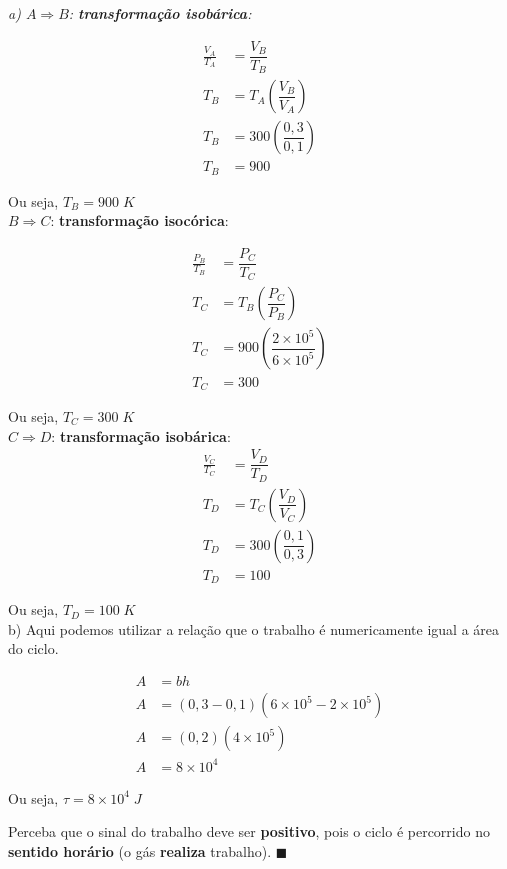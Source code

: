 \documentclass[12pt]{article}
\newenvironment{resposta*}
{\bf Resposta:\\ }
{}
\begin{document}
\begin{resposta*}
{\it a) $A\Rightarrow B$: \textbf{transformação isobárica}:

\begin{align*}
    \frac{V_{A}}{T_{A}} &= \dfrac{V_{B}}{T_{B}} \\
    T_{B} &= T_{A}\left(\dfrac{V_{B}}{V_{A}}\right) \\
    T_{B} &= 300\left(\dfrac{0,3}{0,1}\right) \\
    T_{B} &= 900
\end{align*}

Ou seja, $\boxed{T_{B} = 900\;K}$ \\

$B\Rightarrow C$: \textbf{transformação isocórica}:

\begin{align*}
    \frac{P_{B}}{T_{B}} &= \dfrac{P_{C}}{T_{C}} \\
    T_{C} &= T_{B}\left(\dfrac{P_{C}}{P_{B}}\right) \\
    T_{C} &= 900\left(\dfrac{2\times 10^{5}}{6\times 10^{5}}\right) \\
    T_{C} &= 300
\end{align*}

Ou seja, $\boxed{T_{C} = 300\;K}$ \\

$C\Rightarrow D$: \textbf{transformação isobárica}:
\begin{align*}
    \frac{V_{C}}{T_{C}} &= \dfrac{V_{D}}{T_{D}} \\
    T_{D} &= T_{C}\left(\dfrac{V_{D}}{V_{C}}\right) \\
    T_{D} &= 300\left(\dfrac{0,1}{0,3}\right) \\
    T_{D} &= 100
\end{align*}

Ou seja, $\boxed{T_{D} = 100\;K}$ \\

b) Aqui podemos utilizar a relação que o trabalho é numericamente igual a área do ciclo.

\begin{align*}
    A &= bh \\
    A &= (0,3-0,1)(6\times 10^{5}-2\times 10^{5}) \\
    A &= (0,2)(4\times 10^{5}) \\
    A &= 8\times 10^{4}
\end{align*}

Ou seja, $\boxed{\tau = 8\times 10^{4}\;J}$

Perceba que o sinal do trabalho deve ser \textbf{positivo}, pois o ciclo é percorrido no \textbf{sentido horário} (o gás \textbf{realiza} trabalho). $\blacksquare$}
\end{resposta*}
\end{document}
